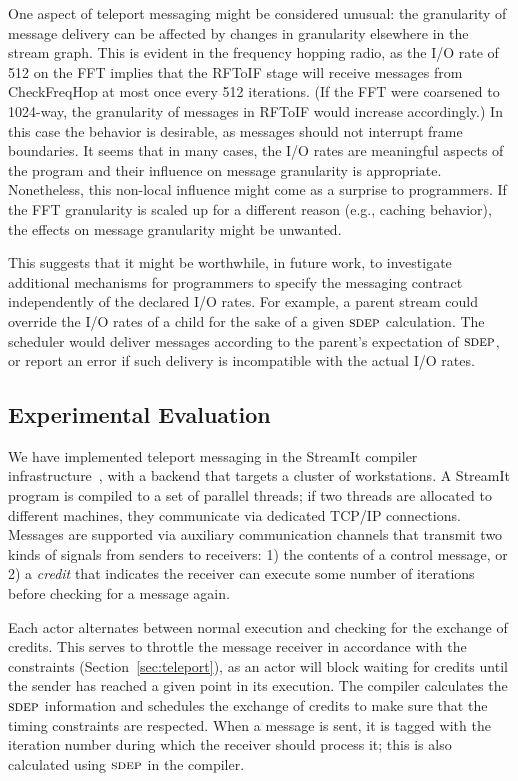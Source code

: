 \documentclass{sig-alternate}
\begin{document}
One aspect of teleport messaging might be considered unusual: the
granularity of message delivery can be affected by changes in
granularity elsewhere in the stream graph.  This is evident in the
frequency hopping radio, as the I/O rate of 512 on the FFT implies
that the RFToIF stage will receive messages from CheckFreqHop at most
once every 512 iterations.  (If the FFT were coarsened to 1024-way,
the granularity of messages in RFToIF would increase accordingly.)  In
this case the behavior is desirable, as messages should not interrupt
frame boundaries.  It seems that in many cases, the I/O rates are
meaningful aspects of the program and their influence on message
granularity is appropriate.  Nonetheless, this non-local influence
might come as a surprise to programmers.  If the FFT granularity is
scaled up for a different reason (e.g., caching behavior), the effects
on message granularity might be unwanted.

This suggests that it might be worthwhile, in future work, to
investigate additional mechanisms for programmers to specify the
messaging contract independently of the declared I/O rates.  For
example, a parent stream could override the I/O rates of a child for
the sake of a given $\textsc{sdep}$ calculation.  The scheduler would deliver
messages according to the parent's expectation of $\textsc{sdep}$, or report
an error if such delivery is incompatible with the actual I/O rates.

\subsection{Experimental Evaluation}
\label{sec:evaluation}

We have implemented teleport messaging in the StreamIt compiler
infrastructure~\cite{streamit-asplos}, with a backend that targets a
cluster of workstations.  A StreamIt program is compiled to a set of
parallel threads; if two threads are allocated to different machines,
they communicate via dedicated TCP/IP connections.  Messages are
supported via auxiliary communication channels that transmit two kinds
of signals from senders to receivers: 1) the contents of a control
message, or 2) a {\it credit} that indicates the receiver can execute
some number of iterations before checking for a message again.

Each actor alternates between normal execution and checking for the
exchange of credits.  This serves to throttle the message receiver in
accordance with the constraints (Section~\ref{sec:teleport}), as an
actor will block waiting for credits until the sender has reached a
given point in its execution.  The compiler calculates the $\textsc{sdep}$
information and schedules the exchange of credits to make sure that
the timing constraints are respected.  When a message is sent, it is
tagged with the iteration number during which the receiver should
process it; this is also calculated using $\textsc{sdep}$ in the compiler.
\end{document}
